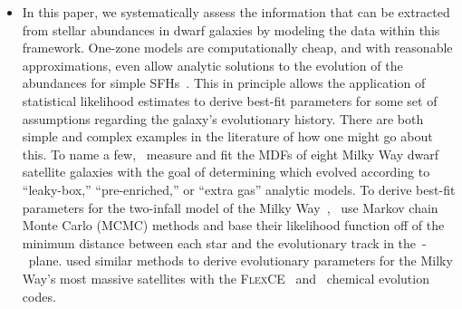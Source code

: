 \documentclass[ms.tex]{subfiles}
\begin{document}
\begin{itemize}


	\item In this paper, we systematically assess the information that can be
	extracted from stellar abundances in dwarf galaxies by modeling the data
	within this framework.
	One-zone models are computationally cheap, and with reasonable
	approximations, even allow analytic solutions to the evolution of the
	abundances for simple SFHs~\citep*[e.g.][]{Weinberg2017}.
	This in principle allows the application of statistical likelihood
	estimates to derive best-fit parameters for some set of assumptions
	regarding the galaxy's evolutionary history.
	There are both simple and complex examples in the literature of how one
	might go about this.
	To name a few,~\citet{Kirby2011} measure and fit the MDFs of eight Milky
	Way dwarf satellite galaxies with the goal of determining which evolved
	according to ``leaky-box,'' ``pre-enriched,'' or ``extra gas'' analytic
	models.
	To derive best-fit parameters for the two-infall model of the Milky
	Way~\citep[e.g.][]{Chiappini1997},~\citet{Spitoni2020, Spitoni2021} use
	Markov chain Monte Carlo (MCMC) methods and base their likelihood function
	off of the minimum distance between each star and the evolutionary track in
	the~\afe-\feh~plane.
	\citet{Hasselquist2021} used similar methods to derive evolutionary
	parameters for the Milky Way's most massive satellites with the
	\textsc{FlexCE}~\citep{Andrews2017} and~\citet{Lian2018, Lian2020} chemical
	evolution codes.


\end{itemize}
\end{document}
